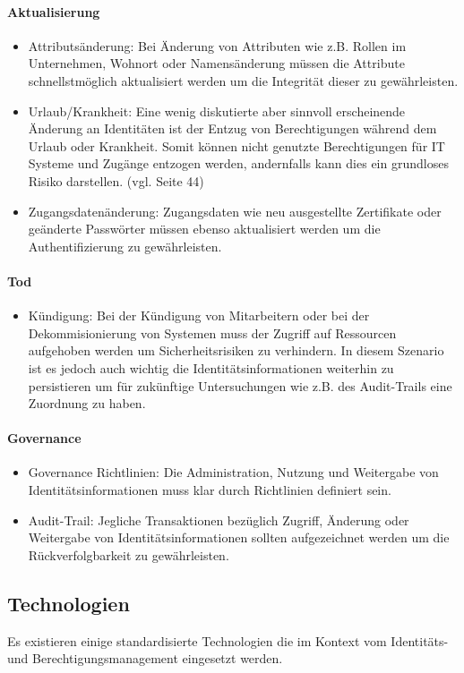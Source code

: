 \documentclass[11pt]{article}
\begin{document}
\paragraph{Aktualisierung}
\begin{itemize}
  \item Attributsänderung: Bei Änderung von Attributen wie z.B. Rollen im Unternehmen, Wohnort oder Namensänderung müssen die Attribute schnellstmöglich aktualisiert werden um die Integrität dieser zu gewährleisten.
  \item Urlaub/Krankheit: Eine wenig diskutierte aber sinnvoll erscheinende Änderung an Identitäten ist der Entzug von Berechtigungen während dem Urlaub oder Krankheit. Somit können nicht genutzte Berechtigungen für IT Systeme und Zugänge entzogen werden, andernfalls kann dies ein grundloses Risiko darstellen. (vgl. \cite{tsolkas2017} Seite 44)
  \item Zugangsdatenänderung: Zugangsdaten wie neu ausgestellte Zertifikate oder geänderte Passwörter müssen ebenso aktualisiert werden um die Authentifizierung zu gewährleisten.
\end{itemize}
\paragraph{Tod}
\begin{itemize}
  \item Kündigung: Bei der Kündigung von Mitarbeitern oder bei der Dekommisionierung von Systemen muss der Zugriff auf Ressourcen aufgehoben werden um Sicherheitsrisiken zu verhindern. In diesem Szenario ist es jedoch auch wichtig die Identitätsinformationen weiterhin zu persistieren um für zukünftige Untersuchungen wie z.B. des Audit-Trails eine Zuordnung zu haben.
\end{itemize}
\paragraph{Governance}
\begin{itemize}
  \item Governance Richtlinien: Die Administration, Nutzung und Weitergabe von Identitätsinformationen muss klar durch Richtlinien definiert sein.
  \item Audit-Trail: Jegliche Transaktionen bezüglich Zugriff, Änderung oder Weitergabe von Identitätsinformationen sollten aufgezeichnet werden um die Rückverfolgbarkeit zu gewährleisten.
\end{itemize}
\subsection{Technologien}
Es existieren einige standardisierte Technologien die im Kontext vom Identitäts- und Berechtigungsmanagement eingesetzt werden.
\end{document}
